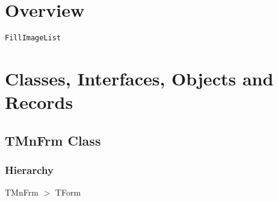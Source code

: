 \documentclass{report}
\newif\ifpdf
\begin{document}
\section{Overview}
\begin{description}
\item[\texttt{\begin{ttfamily}TMnFrm\end{ttfamily} Class}]
\end{description}
\begin{description}
\item[\texttt{FillImageList}]
\end{description}
\section{Classes, Interfaces, Objects and Records}
\ifpdf
\subsection*{\large{\textbf{TMnFrm Class}}\normalsize\hspace{1ex}\hrulefill}
\else
\subsection*{TMnFrm Class}
\fi
\label{manager.TMnFrm}
\subsubsection*{\large{\textbf{Hierarchy}}\normalsize\hspace{1ex}\hfill}
TMnFrm {$>$} TForm
\end{document}
